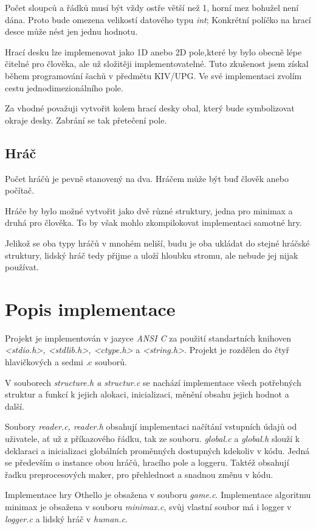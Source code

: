 \documentclass[
12pt,
a4paper,
pdftex,
czech,
titlepage
]{report}
\begin{document}
Počet sloupců a řádků musí být vždy ostře větší než 1, horní mez bohužel není dána. Proto bude omezena velikostí datového typu \textit{int};
Konkrétní políčko na hrací desce může nést jen jednu hodnotu.

Hrací desku lze implemenovat jako 1D anebo 2D pole,které by bylo obecně lépe čitelné pro člověka, ale už složitěji implementovatelné. Tuto zkušenost jsem získal během programování šachů v předmětu KIV/UPG. Ve své implementaci zvolím cestu jednodimezionálního pole.

Za vhodné považuji vytvořit kolem hrací desky obal, který bude symbolizovat okraje desky. Zabrání se tak přetečení pole.

\section{Hráč}
Počet hráčů je pevně stanovený na dva. Hráčem může být buď člověk anebo počítač.

Hráče by bylo možné vytvořit jako dvě různé struktury, jedna pro minimax a druhá pro člověka. To by však mohlo zkompilokovat implementaci samotné hry. 

Jelikož se oba typy hráčů v mnohém neliší, budu je oba ukládat do stejné hráčské struktury, lidský hráč tedy přijme a uloží hloubku stromu, ale nebude jej nijak používat. 

\chapter{Popis implementace}

Projekt je implementován v jazyce \textit{ANSI C} za použití standartních knihoven \textit{<stdio.h>, <stdlib.h>, <ctype.h>} a \textit{<string.h>}.
Projekt je rozdělen do čtyř hlavičkových a sedmi .c souborů.

V souborech \textit{structure.h a structur.c} se nachází implementace všech potřebných struktur a funkcí k jejich alokaci, inicializaci, měnění obsahu jejich hodnot a další. 

Soubory \textit{reader.c, reader.h} obsahují implementaci načítání vstupních údajů od uživatele, ať už z příkazového řádku, tak ze souboru.
\textit{global.c} a \textit{global.h} slouží k deklaraci a inicializaci globálních proměnných dostupných kdekoliv v kódu. Jedná se především o instance obou hráčů, hracího pole a loggeru. Taktéž obsahují řadku preprocesových maker, pro přehlednost a snadnou změnu v kódu.

Implementace hry Othello je obsažena v souboru \textit{game.c}. 
Implementace algoritmu minimax je obsažena v souboru \textit{minimax.c}, svůj vlastní soubor má i logger v \textit{logger.c} a lidský hráč v \textit{human.c}. 
\end{document}

